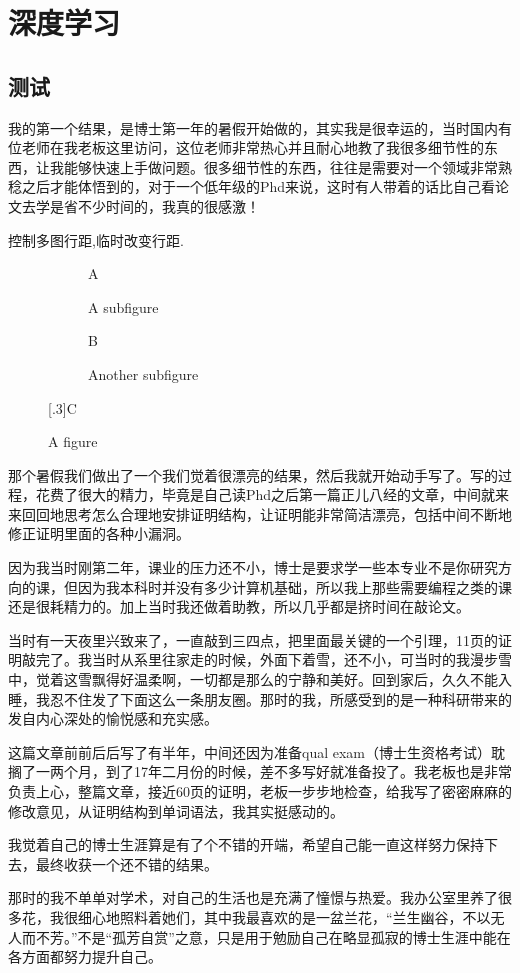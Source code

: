 \chapter{深度学习}

\section{测试}

我的第一个结果，是博士第一年的暑假开始做的，其实我是很幸运的，当时国内有位老师在我老板这里访问，这位老师非常热心并且耐心地教了我很多细节性的东西，让我能够快速上手做问题。很多细节性的东西，往往是需要对一个领域非常熟稔之后才能体悟到的，对于一个低年级的Phd来说，这时有人带着的话比自己看论文去学是省不少时间的，我真的很感激！

控制多图行距,临时改变行距.

\begin{figure}
  \begin{subfigure}[b]{.3\linewidth}
  \centering\large A
  \caption{A subfigure}\label{fig:1a}
  \end{subfigure}%
  \begin{subfigure}[b]{.3\linewidth}
  \centering\large B
  \caption{Another subfigure}\label{fig:1b}
  \end{subfigure} \quad
  [.3\linewidth]{\centering\large C}
  \caption{A figure}\label{fig:1}
\end{figure}

那个暑假我们做出了一个我们觉着很漂亮的结果，然后我就开始动手写了。写的过程，花费了很大的精力，毕竟是自己读Phd之后第一篇正儿八经的文章，中间就来来回回地思考怎么合理地安排证明结构，让证明能非常简洁漂亮，包括中间不断地修正证明里面的各种小漏洞。

因为我当时刚第二年，课业的压力还不小，博士是要求学一些本专业不是你研究方向的课，但因为我本科时并没有多少计算机基础，所以我上那些需要编程之类的课还是很耗精力的。加上当时我还做着助教，所以几乎都是挤时间在敲论文。

当时有一天夜里兴致来了，一直敲到三四点，把里面最关键的一个引理，11页的证明敲完了。我当时从系里往家走的时候，外面下着雪，还不小，可当时的我漫步雪中，觉着这雪飘得好温柔啊，一切都是那么的宁静和美好。回到家后，久久不能入睡，我忍不住发了下面这么一条朋友圈。那时的我，所感受到的是一种科研带来的发自内心深处的愉悦感和充实感。

这篇文章前前后后写了有半年，中间还因为准备qual exam（博士生资格考试）耽搁了一两个月，到了17年二月份的时候，差不多写好就准备投了。我老板也是非常负责上心，整篇文章，接近60页的证明，老板一步步地检查，给我写了密密麻麻的修改意见，从证明结构到单词语法，我其实挺感动的。

我觉着自己的博士生涯算是有了个不错的开端，希望自己能一直这样努力保持下去，最终收获一个还不错的结果。

那时的我不单单对学术，对自己的生活也是充满了憧憬与热爱。我办公室里养了很多花，我很细心地照料着她们，其中我最喜欢的是一盆兰花，“兰生幽谷，不以无人而不芳。”不是“孤芳自赏”之意，只是用于勉励自己在略显孤寂的博士生涯中能在各方面都努力提升自己。
